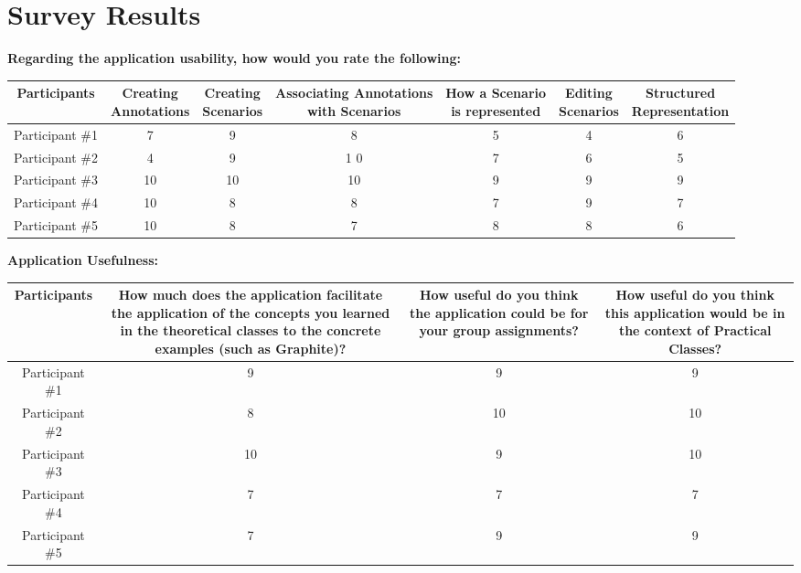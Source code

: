 
\chapter{Survey Results}
\label{appendix:appendix_b}

\textbf{Regarding the application usability, how would you rate the following:}
\begin{table}[h]
\centering
\scriptsize
\begin{tabular}{|c|c|c|c|c|c|c|}
    \hline
     \textbf{Participants} & \parbox[c][1cm]{1.5cm}{\textbf{Creating} \\ \textbf{Annotations}} & \parbox[c][1cm]{1.5cm}{\textbf{Creating}\\ \textbf{Scenarios}} & \parbox[c][1cm]{3cm}{\textbf{Associating Annotations} \\ \textbf{with Scenarios}} & \parbox[c][1cm]{2cm}{\textbf{How a Scenario} \\ \textbf{is represented}} & \parbox[c][1cm]{1.5cm}{\textbf{Editing}\\ \textbf{Scenarios}} & \parbox[c][1cm]{2cm}{\textbf{Structured} \\ \textbf{Representation}}\\ \hline
     Participant \#1 & 7 &	9 &	8 & 5 & 4 & 6\\ \hline
	Participant \#2 & 4 & 9 & 1 0 & 7 & 6 & 5\\ \hline
	Participant \#3 & 10 & 10 & 10 & 9 & 9 & 9\\ \hline
	Participant \#4 & 10 & 8 & 8 & 7 & 9 & 7\\ \hline
	Participant \#5 & 10 & 8 & 7 & 8 & 8 & 6\\ \hline
\end{tabular}
\end{table}

\textbf{Application Usefulness:}	
\begin{table}[h]
\centering
\scriptsize
\begin{tabular}{|c|c|c|c|}
    \hline
     \textbf{Participants} & \parbox[c][2cm]{5cm}{\textbf{How much does the application facilitate the application of the concepts you learned in the theoretical classes to the concrete examples (such as Graphite)?}} & \parbox[c][2cm]{3cm}{\textbf{How useful do you think the application could be for your group assignments?}} & \parbox[c][2cm]{3cm}{\textbf{How useful do you think this application would be in the context of Practical Classes?}} \\ \hline
     Participant \#1 & 9 & 9 & 9\\ \hline
Participant \#2 & 8 & 10 & 10\\ \hline
Participant \#3 & 10 & 9 & 10\\ \hline
Participant \#4 & 7 & 7 & 7\\ \hline
Participant \#5 & 7 & 9 & 9\\ \hline
\end{tabular}
\end{table}

